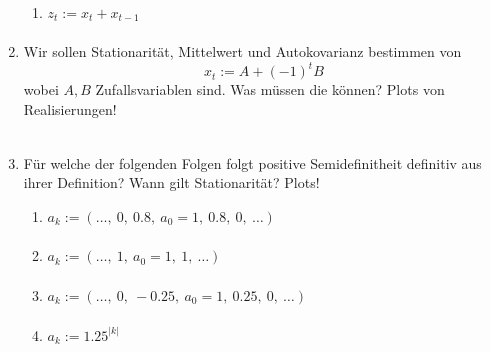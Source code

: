 \documentclass[a4paper,11pt,notitlepage,fullpage]{article}
\begin{document}
\begin{enumerate}
\begin{enumerate}
\item $z_t := x_t + x_{t-1}$
\begin{align*}
\end{align*}
\end{enumerate}

\item Wir sollen Stationarität, Mittelwert und Autokovarianz bestimmen von
$$x_t := A + (-1)^t B$$
wobei $A, B$ Zufallsvariablen sind. Was müssen die können? Plots von Realisierungen!

\begin{align*}
\end{align*}


\item Für welche der folgenden Folgen folgt positive Semidefinitheit definitiv aus ihrer Definition? Wann gilt Stationarität? Plots!
\begin{enumerate}
\item $a_k := (\ldots, ~0, ~0.8, ~a_0=1, ~0.8, ~0, ~\ldots)$
\begin{align*}
\end{align*}

\item $a_k := (\ldots, ~1, ~a_0=1,  ~1, ~\ldots)$
\begin{align*}
\end{align*}

\item $a_k := (\ldots, ~0, ~-0.25, ~a_0=1, ~0.25, ~0, ~\ldots)$
\begin{align*}
\end{align*}

\item $a_k := 1.25^{|k|}$
\begin{align*}
\end{align*}
\end{enumerate}


\end{enumerate}
\end{document}
